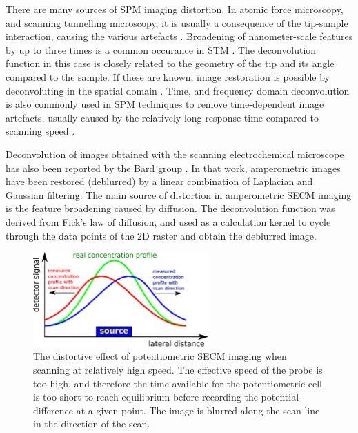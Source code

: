 There are many sources of SPM imaging distortion.
In atomic force microscopy, and scanning tunnelling microscopy, it is usually a consequence of the tip-sample interaction, causing the various artefacts \cite{peter2010atomic}.
Broadening of nanometer-scale features by up to three times is a common occurance in STM \cite{lo1993investigation}.
The deconvolution function in this case is closely related to the geometry of the tip and its angle compared to the sample.
If these are known, image restoration is possible by deconvoluting in the spatial domain \cite{chen2006deconvolution, osiro2012measuring, bukharaev1998three}.
Time, and frequency domain deconvolution is also commonly used in SPM techniques to remove time-dependent image artefacts, usually caused by the relatively long response time compared to scanning speed \cite{robinson1988increasing}.


Deconvolution of images obtained with the scanning electrochemical microscope has also been reported by the Bard group \cite{lee1991scanning}.
In that work, amperometric images have been restored (deblurred) by a linear combination of Laplacian and Gaussian filtering.
The main source of distortion in amperometric SECM imaging is the feature broadening caused by diffusion.
The deconvolution function was derived from Fick's law of diffusion, and used as a calculation kernel to cycle through the data points of the 2D raster and obtain the deblurred image.

\begin{figure}
\centering
\includegraphics[width=0.6\textwidth]{img/theory/distortion3.eps}
\caption{The distortive effect of potentiometric SECM imaging when scanning at relatively high speed.
The effective speed of the probe is too high, and therefore the time available for the potentiometric cell is too short to reach equilibrium before recording the potential difference at a given point.
The image is blurred along the scan line in the direction of the scan.}
\label{fig:distortion}
\end{figure}
